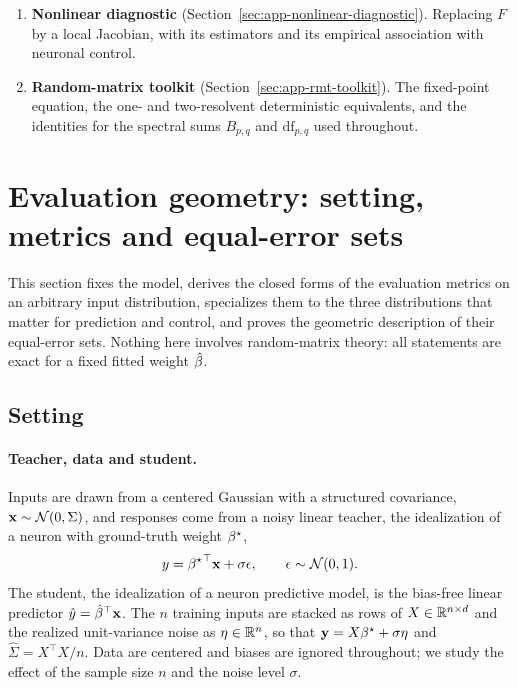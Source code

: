 \begin{enumerate}
\item \textbf{Nonlinear diagnostic} (Section~\ref{sec:app-nonlinear-diagnostic}).
Replacing $F$ by a local Jacobian, with its estimators and its empirical
association with neuronal control.
\item \textbf{Random-matrix toolkit} (Section~\ref{sec:app-rmt-toolkit}).
The fixed-point equation, the one- and two-resolvent deterministic
equivalents, and the identities for the spectral sums $B_{p,q}$ and
$\mathrm{df}_{p,q}$ used throughout.
\end{enumerate}



\section{Evaluation geometry: setting, metrics and equal-error sets}
\label{sec:app-evaluation-geometry}

This section fixes the model, derives the closed forms of the evaluation
metrics on an arbitrary input distribution, specializes them to the three
distributions that matter for prediction and control, and proves the
geometric description of their equal-error sets.  Nothing here involves
random-matrix theory: all statements are exact for a fixed fitted weight
$\hat{\beta}$.

\subsection{Setting}

\paragraph{Teacher, data and student.}
Inputs are drawn from a centered Gaussian with a structured covariance,
$\mathbf{x}\sim\mathcal N(0,\Sigma)$, and responses come from a noisy linear
teacher, the idealization of a neuron with ground-truth weight ${\beta^{\star}}$,
\begin{equation}
y={{\beta^{\star}}}^\top\mathbf{x}+\sigma\epsilon,\qquad\epsilon\sim\mathcal N(0,1).
\end{equation}
The student, the idealization of a neuron predictive model, is the bias-free
linear predictor $\hat y={\hat{\beta}}^\top\mathbf{x}$.  The $n$ training inputs are
stacked as rows of $X\in\mathbb{R}^{n\times d}$ and the realized unit-variance noise as
$\eta\in\mathbb{R}^n$, so that $\mathbf y=X{\beta^{\star}}+\sigma\eta$ and
$\hat\Sigma=X^\top X/n$.  Data are centered and biases are ignored
throughout; we study the effect of the sample size $n$ and the noise level
$\sigma$.

